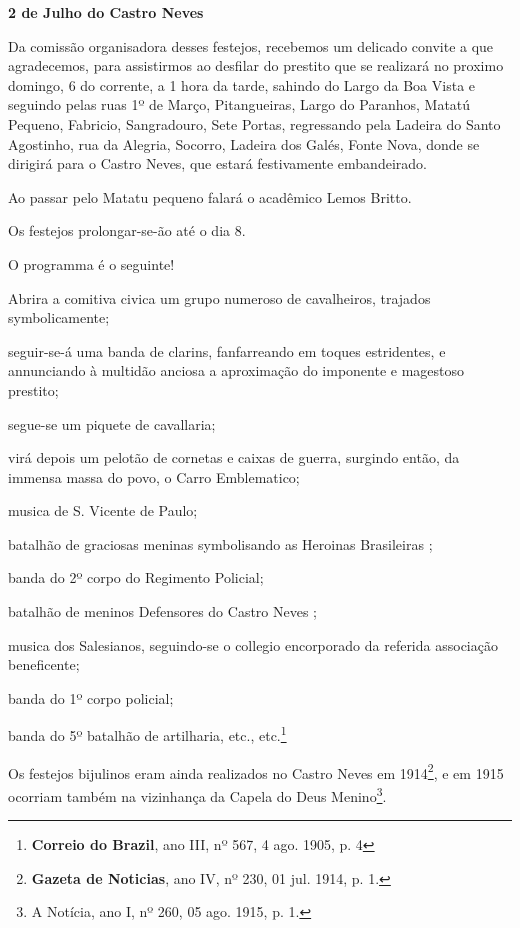 \begin{citacao}
\textbf{2 de Julho do Castro Neves}

Da comissão organisadora desses festejos, recebemos um delicado convite a que agradecemos, para assistirmos ao desfilar do prestito que se realizará no proximo domingo, 6 do corrente, a 1 hora da tarde, sahindo do Largo da Boa Vista e seguindo pelas ruas 1º de Março, Pitangueiras, Largo do Paranhos, Matatú Pequeno, Fabricio, Sangradouro, Sete Portas, regressando pela Ladeira do Santo Agostinho, rua da Alegria, Socorro, Ladeira dos Galés, Fonte Nova, donde se dirigirá para o Castro Neves, que estará festivamente embandeirado.

Ao passar pelo Matatu pequeno falará o acadêmico Lemos Britto.

Os festejos prolongar-se-ão até o dia 8.

O programma é o seguinte!

Abrira a comitiva civica um grupo numeroso de cavalheiros, trajados symbolicamente;

seguir-se-á uma banda de clarins, fanfarreando em toques estridentes, e annunciando à multidão anciosa a aproximação do imponente e magestoso prestito;

segue-se um piquete de cavallaria;

virá depois um pelotão de cornetas e caixas de guerra, surgindo então, da immensa massa do povo, o Carro Emblematico;

musica de S. Vicente de Paulo;

batalhão de graciosas meninas symbolisando as \og Heroinas Brasileiras \fg{};

banda do 2º corpo do Regimento Policial;

batalhão de meninos \og Defensores do Castro Neves \fg{};

musica dos Salesianos, seguindo-se o collegio encorporado da referida associação beneficente;

banda do 1º corpo policial;

banda do 5º batalhão de artilharia, etc., etc.\footnote{\textbf{Correio do Brazil}, ano III, nº 567, 4 ago. 1905, p. 4}
\end{citacao}

Os festejos bijulinos eram ainda realizados no Castro Neves em 1914\footnote{\textbf{Gazeta de Noticias}, ano IV, nº 230, 01 jul. 1914, p. 1.}, e em 1915 ocorriam também na vizinhança da Capela do Deus Menino\footnote{A Notícia, ano I, nº 260, 05 ago. 1915, p. 1.}.

